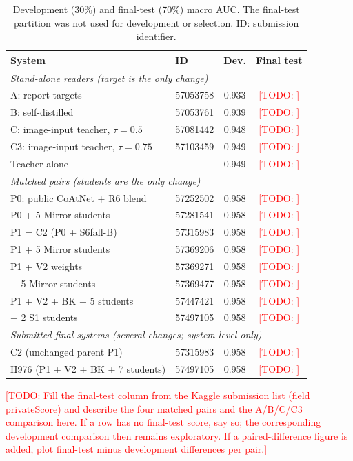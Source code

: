 \documentclass{ieeeaccess}
\newcommand{\TODO}[1]{\textcolor{red}{[TODO: #1]}}
\begin{document}
\begin{table}[!t]
\centering
\caption{Development (30\%) and final-test (70\%) macro AUC. The final-test partition was not used for development or
selection. ID: submission identifier.}
\label{tab:final}
\footnotesize
\setlength{\tabcolsep}{2.5pt}
\begin{tabular}{llcc}
\toprule
System & ID & Dev. & Final test\\
\midrule
\multicolumn{4}{l}{\emph{Stand-alone readers (target is the only change)}}\\
A: report targets & 57053758 & 0.933 & \TODO{}\\
B: self-distilled & 57053761 & 0.939 & \TODO{}\\
C: image-input teacher, $\tau=0.5$ & 57081442 & 0.948 & \TODO{}\\
C3: image-input teacher, $\tau=0.75$ & 57103459 & 0.949 & \TODO{}\\
Teacher alone~\cite{nartaa2026mirror} & -- & 0.949 & \TODO{}\\
\midrule
\multicolumn{4}{l}{\emph{Matched pairs (students are the only change)}}\\
P0: public CoAtNet + R6 blend & 57252502 & 0.958 & \TODO{}\\
\quad P0 + 5 Mirror students & 57281541 & 0.958 & \TODO{}\\
P1 = C2 (P0 + S6fall-B) & 57315983 & 0.958 & \TODO{}\\
\quad P1 + 5 Mirror students & 57369206 & 0.958 & \TODO{}\\
P1 + V2 weights & 57369271 & 0.958 & \TODO{}\\
\quad + 5 Mirror students & 57369477 & 0.958 & \TODO{}\\
P1 + V2 + BK + 5 students & 57447421 & 0.958 & \TODO{}\\
\quad + 2 S1 students & 57497105 & 0.958 & \TODO{}\\
\midrule
\multicolumn{4}{l}{\emph{Submitted final systems (several changes; system level only)}}\\
C2 (unchanged parent P1) & 57315983 & 0.958 & \TODO{}\\
H976 (P1 + V2 + BK + 7 students) & 57497105 & 0.958 & \TODO{}\\
\bottomrule
\end{tabular}
\end{table}

\TODO{Fill the final-test column from the Kaggle submission list (field privateScore) and describe the four matched pairs
and the A/B/C/C3 comparison here. If a row has no final-test score, say so; the corresponding development comparison then
remains exploratory. If a paired-difference figure is added, plot final-test minus development differences per pair.}
\end{document}

